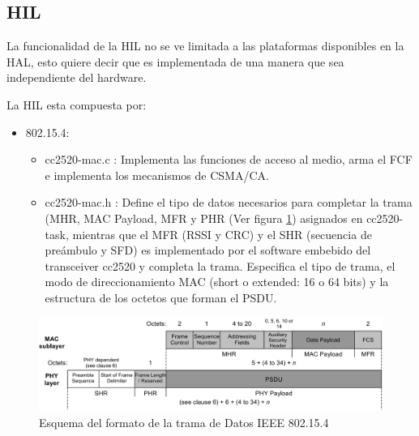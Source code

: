 {%
\subsection{HIL}
\label{subsec:hil}
La funcionalidad de la HIL no se ve limitada a las plataformas disponibles en la HAL, esto quiere decir que es implementada de una manera que sea independiente del hardware.

\noindent La HIL esta compuesta por:
\begin{itemize}
\item 802.15.4:
	\begin{itemize}
	\item cc2520-mac.c : Implementa las funciones de acceso al medio, arma el FCF e implementa los mecanismos de CSMA/CA.
	\item cc2520-mac.h : Define el tipo de datos necesarios para completar la trama (MHR, MAC Payload, MFR y PHR (Ver figura \ref{fig:data}) asignados en cc2520-task, mientras que el MFR (RSSI y CRC) y el SHR (secuencia de preámbulo y SFD) es implementado por el software embebido del transceiver cc2520 y completa la trama. Especifica el tipo de trama, el modo de direccionamiento MAC (short o extended: 16 o 64 bits) y la estructura de los octetos que forman el PSDU.
	\end{itemize}
\end{itemize}

\vspace{20px}
\begin{figure}[h!]
	\centering
    \includegraphics[width=1\textwidth]{./Figures/data.jpg}
    	\caption{Esquema del formato de la trama de Datos IEEE 802.15.4 \citep{802154}}
	\label{fig:data}
\end{figure}

}
